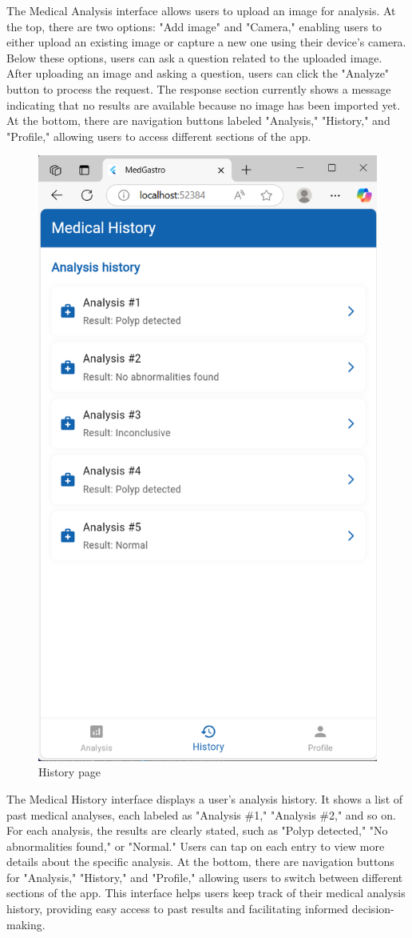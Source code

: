 \documentclass[12pt,a4paper]{report}
\begin{document}
The Medical Analysis interface allows users to upload an image for analysis. At the top, there are two options: "Add image" and "Camera," enabling users to either upload an existing image or capture a new one using their device's camera. Below these options, users can ask a question related to the uploaded image. After uploading an image and asking a question, users can click the "Analyze" button to process the request. The response section currently shows a message indicating that no results are available because no image has been imported yet. At the bottom, there are navigation buttons labeled "Analysis," "History," and "Profile," allowing users to access different sections of the app.

\begin{figure}[H]
    \centering
    \includegraphics[width=0.5\linewidth]{i5.png}
    \caption{History page}
    \label{fig:enter-label}
\end{figure}

The Medical History interface displays a user's analysis history. It shows a list of past medical analyses, each labeled as "Analysis \#1," "Analysis \#2," and so on. For each analysis, the results are clearly stated, such as "Polyp detected," "No abnormalities found," or "Normal." Users can tap on each entry to view more details about the specific analysis. At the bottom, there are navigation buttons for "Analysis," "History," and "Profile," allowing users to switch between different sections of the app. This interface helps users keep track of their medical analysis history, providing easy access to past results and facilitating informed decision-making.
\end{document}
